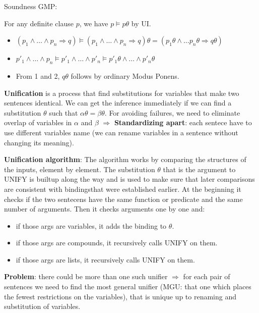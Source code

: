 \documentclass[12pt]{article}
\begin{document}
\begin{enumerate}[label=\textbf{FOL.\arabic*}]
    Soundness GMP:

    For any definite clause $p$, we have $p\vDash p\theta$ by UI.
    \begin{itemize}
        \item $(p_1\land\ldots\land p_n \Rightarrow q)\vDash(p_1\land\ldots\land p_n \Rightarrow q)\theta=(p_1\theta\land\ldots p_n\theta\Rightarrow q\theta)$
        \item $p'_1\land\ldots\land p_n \vDash p'_1\land\ldots\land p'_n\vDash p'_1\theta\land\ldots\land p'_n\theta$
        \item From 1 and 2, $q\theta$ follows by ordinary Modus Ponens.
    \end{itemize}

    \textbf{Unification} is a process that find substitutions for variables that make two sentences identical.
    We can get the inference immediately if we can find a substitution $\theta$ such that $\alpha\theta = \beta\theta$.
    For avoiding failures, we need to eliminate overlap of variables in $\alpha$ and $\beta$ $\Rightarrow$ \textbf{Standardizing apart}:
    each sentece have to use different variables name (we can rename variables in a sentence without changing its meaning).

    \textbf{Unification algorithm}:
    The algorithm works by comparing the structures of the inputs, element by element.
    The substitution $\theta$ that is the argument to UNIFY is builtup along the way and is used to make sure that later comparisons are consistent with bindingsthat were established earlier.
    At the beginning it checks if the two sentecens have the same function or predicate and the same number of arguments.
    Then it checks arguments one by one and:
    \begin{itemize}
        \item if those args are variables, it adds the binding to $\theta$.
        \item if those args are compounds, it recursively calls UNIFY on them.
        \item if those args are lists, it recursively calls UNIFY on them.
    \end{itemize}

    \textbf{Problem}: there could be more than one such unifier $\Rightarrow$ for each pair of sentences we need to find the most general unifier
    (MGU\@: that one which places the fewest restrictions on the variables), 
    that is unique up to renaming and substitution of variables.


\end{enumerate}
\end{document}
